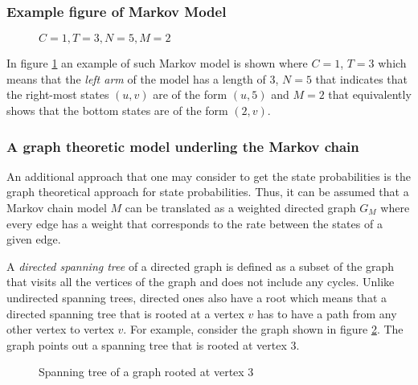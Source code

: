 \subsubsection{Example figure of Markov Model}

\begin{figure}[h]
    \centering
    \scalebox{0.6}{}
    \caption{\(C=1, T=3, N=5, M=2\)}
    \label{fig:Markov_1352_example_for_closed_form}
\end{figure}

In figure \ref{fig:Markov_1352_example_for_closed_form} an example of such Markov model is shown where \(C=1\), \(T=3\) which means that the \textit{left arm} of the model has a length of \(3\), \(N=5\) that indicates that the right-most states \((u,v)\) are of the form \((u,5)\) and \(M=2\) that equivalently shows that the bottom states are of the form \((2,v)\).

\subsubsection{A graph theoretic model underling the Markov chain}

An additional approach that one may consider to get the state probabilities is the graph theoretical approach for state probabilities.
Thus, it can be assumed that a Markov chain model \(M\) can be translated as a weighted directed graph \(G_M\) where every edge has a weight that corresponds to the rate between the states of a given edge.

A \textit{directed spanning tree} of a directed graph is defined as a subset of the graph that visits all the vertices of the graph and does not include any cycles. 
Unlike undirected spanning trees, directed ones also have a root which means that a directed spanning tree that is rooted at a vertex \(v\) has to have a path from any other vertex to vertex \(v\). 
For example, consider the graph shown in figure \ref{fig:example_spanning_tree}. The graph points out a spanning tree that is rooted at vertex 3.


\begin{figure}[h]
    \centering
    \caption{Spanning tree of a graph rooted at vertex 3}
    \label{fig:example_spanning_tree}
\end{figure}

